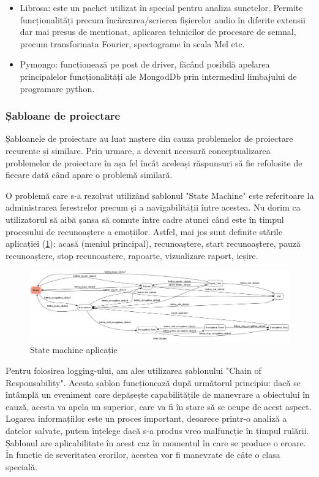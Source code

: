 \documentclass[a4paper, 12pt]{report}
\begin{document}
\begin{itemize}
		\item Librosa: este un pachet utilizat în special pentru analiza sunetelor. Permite funcționalități precum încărcarea/scrierea fișierelor audio în diferite extensii dar mai presus de menționat, aplicarea tehnicilor de procesare de semnal, precum transformata Fourier, spectograme în scala Mel etc.
	
		\item Pymongo: funcționează pe post de driver, făcând posibilă apelarea principalelor funcționalități ale MongodDb prin intermediul limbajului de programare python.
	\end{itemize}
	
	\subsubsection{Șabloane de proiectare}
	Șabloanele de proiectare au luat naștere din cauza problemelor de proiectare recurente și similare. Prin urmare, a devenit necesară conceptualizarea problemelor de proiectare în așa fel încât aceleași răspunsuri să fie refolosite de fiecare dată când apare o problemă similară.

	O problemă care s-a rezolvat utilizând șablonul "State Machine" este referitoare la administrarea ferestrelor precum și a navigabilității între acestea. Nu dorim ca utilizatorul să aibă șansa să comute între cadre atunci când este în timpul procesului de recunoaștere a emoțiilor. Astfel, mai jos sunt definite stările aplicației (\ref{fig:state}): acasă (meniul principal), recunoaștere, start recunoaștere, pauză recunoaștere, stop recunoaștere, rapoarte, vizualizare raport, ieșire.
	
	\begin{figure}[H]
		\begin{center}
			\includegraphics[scale=0.2]{images/state_diagram.png}
		\end{center}
		\caption{State machine aplicație}
		\label{fig:state}
	\end{figure} 	
	
	Pentru folosirea logging-ului, am ales utilizarea șablonului "Chain of Responsability". Acesta șablon funcționează după următorul principiu: dacă se întâmplă un eveniment care depășește capabilitățile de manevrare a obiectului în cauză, acesta va apela un superior, care va fi în stare să se ocupe de acest aspect. Logarea informațiilor este un proces important, deoarece printr-o analiză a datelor salvate, putem înțelege dacă s-a produs vreo malfuncție în timpul rulării. Șablonul are aplicabilitate în acest caz în momentul în care se produce o eroare. În funcție de severitatea erorilor, acestea vor fi manevrate de câte o clasa specială. 
	
\end{document}

